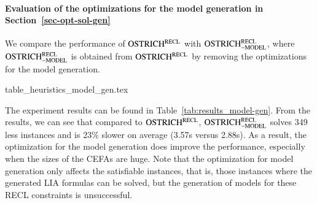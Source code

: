 

\paragraph*{Evaluation of the optimizations for the model generation in Section~\ref{sec-opt-sol-gen}}

We compare the performance of $\rm OSTRICH^{RECL}$ with $\rm OSTRICH^{RECL}_{\rm -MODEL}$, where $\rm OSTRICH^{RECL}_{\rm -MODEL}$ is obtained from $\rm OSTRICH^{RECL}$ by removing the optimizations for the model generation. 

\begin{table}[htbp]
  {table_heuristics_model_gen.tex}
  \caption{Evaluation of the optimizations for the model generation in Section~\ref{sec-opt-sol-gen}}\label{tab:results_model-gen}
\end{table}

The experiment results can be found in Table~\ref{tab:results_model-gen}. From the results, we can see that compared to $\rm OSTRICH^{RECL}$, $\rm OSTRICH^{RECL}_{\rm -MODEL}$ solves 349 less instances and is 23\% slower on average (3.57s versus 2.88s). As a result, the optimization for the model generation does improve the performance, especially when the sizes of the CEFAs are huge.  
Note that the optimization for model generation only affects the satisfiable instances, that is, those instances where the generated LIA formulas can be solved, but the generation of models for these RECL constraints is unsuccessful. 


